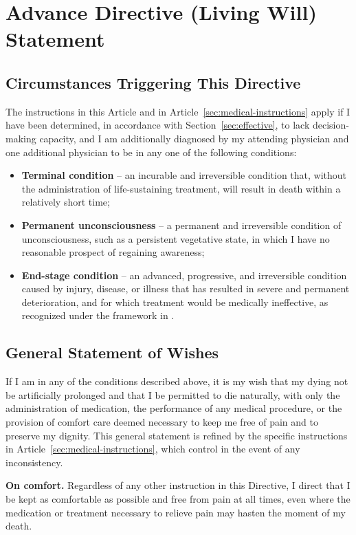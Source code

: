 \section{Advance Directive (Living Will) Statement}
\label{sec:advance-directive}

\subsection{Circumstances Triggering This Directive}
The instructions in this Article and in Article~\ref{sec:medical-instructions} apply if I have been determined, in accordance with Section~\ref{sec:effective}, to lack decision-making capacity, and I am additionally diagnosed by my attending physician and one additional physician to be in any one of the following conditions:
\begin{itemize}[label=\textbullet,leftmargin=1.4em,itemsep=2pt,topsep=2pt]
\item \textbf{Terminal condition} -- an incurable and irreversible condition that, without the administration of life-sustaining treatment, will result in death within a relatively short time;
\item \textbf{Permanent unconsciousness} -- a permanent and irreversible condition of unconsciousness, such as a persistent vegetative state, in which I have no reasonable prospect of regaining awareness;
\item \textbf{End-stage condition} -- an advanced, progressive, and irreversible condition caused by injury, disease, or illness that has resulted in severe and permanent deterioration, and for which treatment would be medically ineffective, as recognized under the framework in \citet{uhcda1993}.
\end{itemize}

\subsection{General Statement of Wishes}
If I am in any of the conditions described above, it is my wish that my dying not be artificially prolonged and that I be permitted to die naturally, with only the administration of medication, the performance of any medical procedure, or the provision of comfort care deemed necessary to keep me free of pain and to preserve my dignity. This general statement is refined by the specific instructions in Article~\ref{sec:medical-instructions}, which control in the event of any inconsistency.

\begin{noticebox}
\textbf{On comfort.} Regardless of any other instruction in this Directive, I direct that I be kept as comfortable as possible and free from pain at all times, even where the medication or treatment necessary to relieve pain may hasten the moment of my death.
\end{noticebox}

